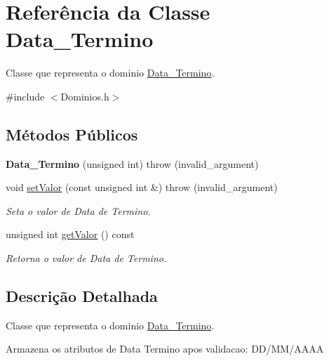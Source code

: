 \hypertarget{class_data___termino}{
\section{\-Referência da \-Classe \-Data\-\_\-\-Termino}
\label{class_data___termino}
}


\-Classe que representa o dominio \hyperlink{class_data___termino}{\-Data\-\_\-\-Termino}.  




{\ttfamily \#include $<$\-Dominios.\-h$>$}

\subsection*{\-Métodos \-Públicos}
\begin{DoxyCompactItemize}
\item 
\hypertarget{class_data___termino_aba9f868e567e2d5c8c13197e77f1dc5c}{
{\bfseries \-Data\-\_\-\-Termino} (unsigned int)  throw (invalid\-\_\-argument)}
\label{class_data___termino_aba9f868e567e2d5c8c13197e77f1dc5c}

\item 
void \hyperlink{class_data___termino_a90fee567953e20e803b54da195132281}{set\-Valor} (const unsigned int \&)  throw (invalid\-\_\-argument)
\begin{DoxyCompactList}\small\item\em \-Seta o valor de \-Data de \-Termino. \end{DoxyCompactList}\item 
unsigned int \hyperlink{class_data___termino_ad5265c6ec1c563ed89f4fc9a6588ac8b}{get\-Valor} () const 
\begin{DoxyCompactList}\small\item\em \-Retorna o valor de \-Data de \-Termino. \end{DoxyCompactList}\end{DoxyCompactItemize}


\subsection{\-Descrição \-Detalhada}
\-Classe que representa o dominio \hyperlink{class_data___termino}{\-Data\-\_\-\-Termino}. 

\-Armazena os atributos de \-Data \-Termino apos validacao\-: \-D\-D/\-M\-M/\-A\-A\-A\-A 

